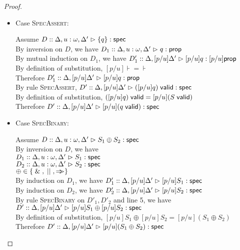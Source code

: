 \begin{proof}
\begin{enumerate}
\begin{itemize}
    \item Case \textsc{SpecAssert}:
      \begin{tabbedproof}
        \oo Assume $D :: \judgeS[{\Delta, u:\omega, \Delta'}]{\setof{q}}$ \\
        \ooo By inversion on $D$, we have $D_1 :: \judgeA[{\Delta, u:\omega, \Delta'}]{q}{\assert}$ \\
        \ooo By mutual induction on $D_1$, we have 
              $D'_1 :: \judgeA[{\Delta, [p/u]\Delta'}]{[p/u]q}{[p/u]\assert}$ \\
        \ooo By definition of substitution, $[p/u]\assert = \assert$ \\
        \ooo Therefore $D'_1 :: \judgeA[{\Delta, [p/u]\Delta'}]{[p/u]q}{\assert}$ \\
        \ooo By rule \textsc{SpecAssert}, 
              $D' :: \judgeS[{\Delta, [p/u]\Delta'}]{\validprop{([p/u]q)}}$ \\
        \ooo By definition of substitution, $\validprop{([p/u]q)} = [p/u](\validprop{S})$ \\
        \ooo Therefore 
             $D' :: \judgeS[{\Delta, [p/u]\Delta'}]{[p/u](\validprop{q})}$ \\
      \end{tabbedproof}

    \item Case \textsc{SpecBinary}:
      \begin{tabbedproof}
        \oo Assume $D :: \judgeS[{\Delta, u:\omega, \Delta'}]{S_1 \oplus S_2}$ \\
        \ooo By inversion on $D$, we have \\
        \oooo $D_1 :: \judgeS[{\Delta, u:\omega, \Delta'}]{S_1}$ \\
        \oooo $D_2 :: \judgeS[{\Delta, u:\omega, \Delta'}]{S_2}$ \\
        \oooo $\oplus \in \setof{\specand, \specor, \specimp}$ \\
        \ooo By induction on $D_1$, we have 
               $D'_1 :: \judgeS[{\Delta, [p/u]\Delta'}]{[p/u]S_1}$ \\
        \ooo By induction on $D_2$, we have 
               $D'_2 :: \judgeS[{\Delta, [p/u]\Delta'}]{[p/u]S_2}$ \\
        \ooo By rule \textsc{SpecBinary} on $D'_1, D'_2$ and line 5, we have \\
        \ooox $D' :: \judgeS[{\Delta, [p/u]\Delta'}]{[p/u]S_1 \oplus [p/u]S_2}$ \\
        \ooo By definition of substitution, $[p/u]S_1 \oplus [p/u]S_2 = [p/u](S_1 \oplus S_2)$ \\
        \ooo Therefore $D' :: \judgeS[{\Delta, [p/u]\Delta'}]{[p/u](S_1 \oplus S_2)}$ \\
      \end{tabbedproof}


\end{itemize}
\end{enumerate}
\end{proof}
